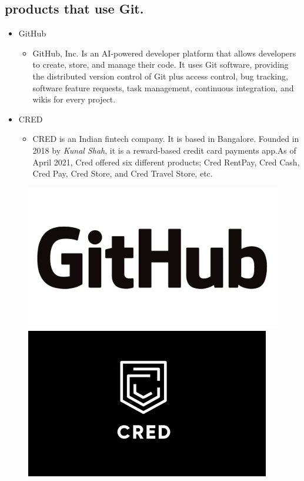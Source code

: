 \documentclass[a4paper,11pt]{report}
\begin{document}
\subsection{products that use Git.}
\begin{itemize}
    \item GitHub
    \begin{itemize}
         \item GitHub, Inc. Is an AI-powered developer platform that allows developers to create, store, and manage their code. It uses Git software, providing the distributed version control of Git plus access control, bug tracking, software feature requests, task management, continuous integration, and wikis for every project.
\end{itemize}
\end{itemize}

\begin{itemize}
    \item CRED
    \begin{itemize}
         \item CRED is an Indian fintech company. It is based in Bangalore. Founded in 2018 by \textit{Kunal Shah}, it is a reward-based credit card payments app.As of April 2021, Cred offered six different products; Cred RentPay, Cred Cash, Cred Pay, Cred Store, and Cred Travel Store, etc.
\end{itemize}
\end{itemize}



\begin{figure}[!h]
    \centering
    \includegraphics[scale=0.01]{img11.png}
    \hspace{3cm}
\includegraphics[scale=0.2]{img12.png}
\end{figure}
\end{document}
